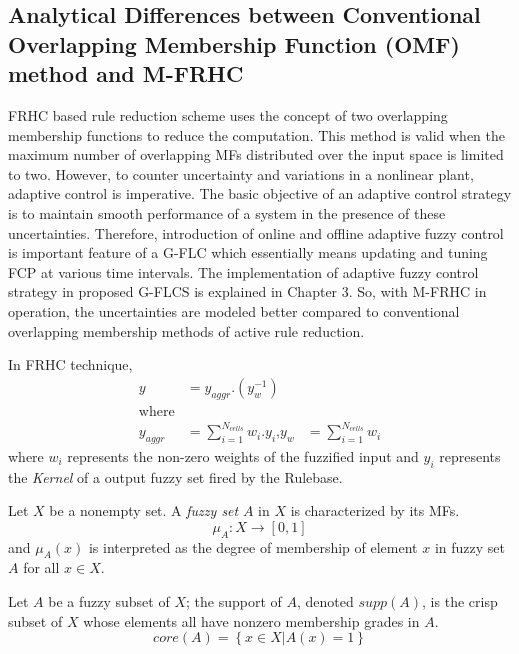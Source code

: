 \subsection{Analytical Differences between Conventional Overlapping Membership Function (OMF) method and M-FRHC}
FRHC based rule reduction scheme uses the concept of two overlapping membership functions to reduce the computation. This method is valid when the maximum number of overlapping MFs distributed over the input space is limited to two. However, to counter uncertainty and variations in a nonlinear plant, adaptive control is imperative. The basic objective of an adaptive control strategy is to maintain smooth performance of a system in the presence of these uncertainties. Therefore, introduction of online and offline adaptive fuzzy control is important feature of a G-FLC which essentially means updating and tuning FCP at various time intervals. The implementation of adaptive fuzzy control strategy in proposed G-FLCS is explained in Chapter 3. So, with M-FRHC in operation, the uncertainties are modeled better compared to conventional overlapping membership methods of active rule reduction.   

In FRHC technique, \cite{Kalaykov1999,Eichfeld1992}
\begin{align} \label{eq:FRHC_main}
y&= y_{aggr}.\left ( y_{w}^{-1} \right ) \\
\text{where}\\ \nonumber
y_{aggr}&=\sum_{i=1}^{N_{cells}} w_{i}.y_{i} \text{,} y_{w}&=\sum_{i=1}^{N_{cells}} w_{i} \nonumber 
\end{align}
where $ w_{i} $ represents the non-zero weights of the fuzzified input and $ y_{i} $ represents the \textit{Kernel} of a output fuzzy set fired by the Rulebase. 

\begin{Definition}\label{def:fSet} 
Let $ X $ be a nonempty set. A \emph{fuzzy set} $ A $ in $ X $ is characterized by its MFs.
\[{\mu _A}:X \to \left[ {0,1} \right]\]
and $ {\mu _A}(x) $ is interpreted as the degree of membership of element $ x $ in fuzzy set $ A $ for all $x \in X$.
\end{Definition} 

\begin{Definition}\label{def:kernel} 
	Let $ A $ be a fuzzy subset of $ X $; the support of $ A $, denoted $ supp(A) $, is the crisp subset of $ X $ whose elements all have nonzero membership grades in $ A $.
	\[core\left( A \right) = \left\{ {x \in X|A\left( x \right) = 1} \right\}\]
\end{Definition} 


